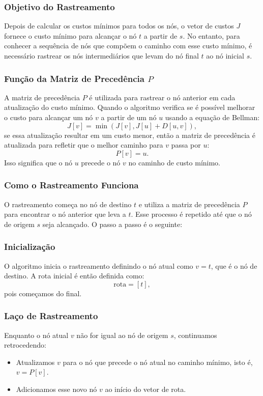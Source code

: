\documentclass{article}
\begin{document}
\subsubsection*{Objetivo do Rastreamento}
Depois de calcular os custos mínimos para todos os nós, o vetor de custos \( J \) fornece o custo mínimo para alcançar o nó \( t \) a partir de \( s \). No entanto, para conhecer a sequência de nós que compõem o caminho com esse custo mínimo, é necessário rastrear os nós intermediários que levam do nó final \( t \) ao nó inicial \( s \).

\subsubsection*{Função da Matriz de Precedência \( P \)}
A matriz de precedência \( P \) é utilizada para rastrear o nó anterior em cada atualização do custo mínimo. Quando o algoritmo verifica se é possível melhorar o custo para alcançar um nó \( v \) a partir de um nó \( u \) usando a equação de Bellman:
\[
J[v] = \min \left( J[v], J[u] + D[u, v] \right),
\]
se essa atualização resultar em um custo menor, então a matriz de precedência é atualizada para refletir que o melhor caminho para \( v \) passa por \( u \):
\[
P[v] = u.
\]
Isso significa que o nó \( u \) precede o nó \( v \) no caminho de custo mínimo.

\subsubsection*{Como o Rastreamento Funciona}
O rastreamento começa no nó de destino \( t \) e utiliza a matriz de precedência \( P \) para encontrar o nó anterior que leva a \( t \). Esse processo é repetido até que o nó de origem \( s \) seja alcançado. O passo a passo é o seguinte:

\subsubsection*{Inicialização}
O algoritmo inicia o rastreamento definindo o nó atual como \( v = t \), que é o nó de destino. A rota inicial é então definida como:
\[
\text{rota} = [t],
\]
pois começamos do final.

\subsubsection*{Laço de Rastreamento}
Enquanto o nó atual \( v \) não for igual ao nó de origem \( s \), continuamos retrocedendo:
\begin{itemize}
    \item Atualizamos \( v \) para o nó que precede o nó atual no caminho mínimo, isto é, \( v = P[v] \).
    \item Adicionamos esse novo nó \( v \) ao início do vetor de rota.
\end{itemize}
\end{document}
